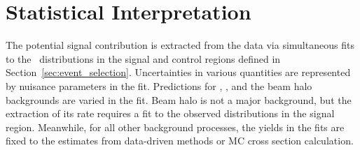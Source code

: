 \section{Statistical Interpretation}
\label{sec:interpretation}

The potential signal contribution is extracted from the data via simultaneous fits to the
\ETg\ distributions in the signal and control regions defined in Section~\ref{sec:event_selection}. 
Uncertainties in various quantities are represented by nuisance parameters in the fit. 
Predictions for \zinvg, \wlng, and the beam halo backgrounds are varied in the fit. 
Beam halo is not a major background, but the extraction of its rate requires a fit to the observed distributions in the signal region.
Meanwhile, for all other background processes, the yields in the fits are fixed to the estimates from data-driven methods or MC cross section calculation. 

